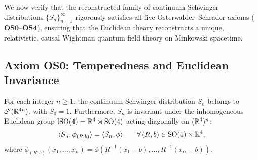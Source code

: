 We now verify that the reconstructed family of continuum Schwinger distributions $\{S_n\}_{n=1}^\infty$ rigorously satisfies all five Osterwalder--Schrader axioms ($\mathbf{OS0}$--$\mathbf{OS4}$), ensuring that the Euclidean theory reconstructs a unique, relativistic, causal Wightman quantum field theory on Minkowski spacetime.

\subsection{Axiom OS0: Temperedness and Euclidean Invariance}
\label{subsec:os0}

\begin{proposition}
\label{prop:os0}
For each integer $n \ge 1$, the continuum Schwinger distribution $S_n$ belongs to $\mathcal{S}'(\mathbb{R}^{4n})$, with $S_0 = 1$. Furthermore, $S_n$ is invariant under the inhomogeneous Euclidean group $\mathrm{ISO}(4) = \mathbb{R}^4 \rtimes \mathrm{SO}(4)$ acting diagonally on $(\mathbb{R}^4)^n$:
\begin{equation}
\label{eq:os0_euclidean_invariance}
\langle S_n, \phi_{(R, b)} \rangle = \langle S_n, \phi \rangle \qquad \forall \, (R, b) \in \mathrm{SO}(4) \ltimes \mathbb{R}^4,
\end{equation}
where $\phi_{(R, b)}(x_1, \dots, x_n) = \phi(R^{-1}(x_1 - b), \dots, R^{-1}(x_n - b))$.
\end{proposition}

